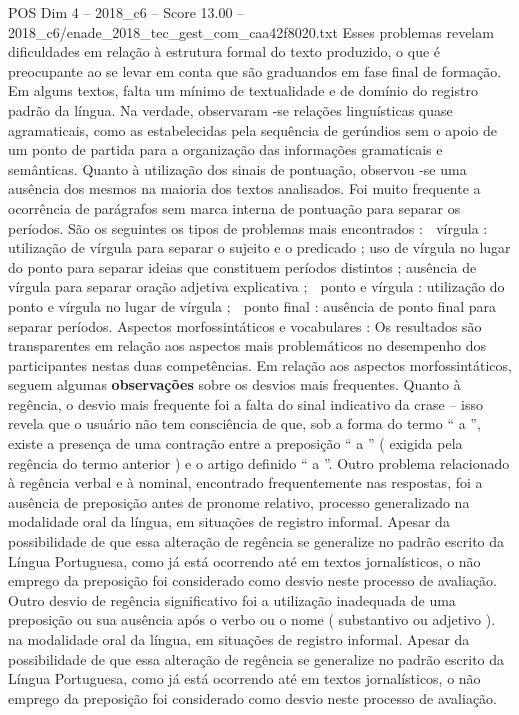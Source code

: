 \begin{textsample}{POS Dim 4 – 2018\_c6 – Score 13.00 – 2018\_c6/enade\_2018\_tec\_gest\_com\_caa42f8020.txt}
Esses problemas revelam dificuldades em relação à estrutura formal do texto produzido, o que é preocupante ao se levar em conta que são graduandos em fase final de formação.
Em alguns textos, falta um mínimo de textualidade e de domínio do registro padrão da língua.
Na verdade, observaram -se relações linguísticas quase agramaticais, como as estabelecidas pela sequência de gerúndios sem o apoio de um ponto de partida para a organização das informações gramaticais e semânticas.
Quanto à utilização dos sinais de pontuação, observou -se uma ausência dos mesmos na maioria dos textos analisados.
Foi muito frequente a ocorrência de parágrafos sem marca interna de pontuação para separar os períodos.
São os seguintes os tipos de problemas mais encontrados :  vírgula : utilização de vírgula para separar o sujeito e o predicado ; uso de vírgula no lugar do ponto para separar ideias que constituem períodos distintos ; ausência de vírgula para separar oração adjetiva explicativa ;  ponto e vírgula : utilização do ponto e vírgula no lugar de vírgula ;  ponto final : ausência de ponto final para separar períodos.
Aspectos morfossintáticos e vocabulares : Os resultados são transparentes em relação aos aspectos mais problemáticos no desempenho dos participantes nestas duas competências.
Em relação aos aspectos morfossintáticos, seguem algumas \textbf{observações} sobre os desvios mais frequentes.
Quanto à regência, o desvio mais frequente foi a falta do sinal indicativo da crase – isso revela que o usuário não tem consciência de que, sob a forma do termo “ a ”, existe a presença de uma contração entre a preposição “ a ” ( exigida pela regência do termo anterior ) e o artigo definido “ a ”.
Outro problema relacionado à regência verbal e à nominal, encontrado frequentemente nas respostas, foi a ausência de preposição antes de pronome relativo, processo generalizado na modalidade oral da língua, em situações de registro informal.
Apesar da possibilidade de que essa alteração de regência se generalize no padrão escrito da Língua Portuguesa, como já está ocorrendo até em textos jornalísticos, o não emprego da preposição foi considerado como desvio neste processo de avaliação.
Outro desvio de regência significativo foi a utilização inadequada de uma preposição ou sua ausência após o verbo ou o nome ( substantivo ou adjetivo ). na modalidade oral da língua, em situações de registro informal.
Apesar da possibilidade de que essa alteração de regência se generalize no padrão escrito da Língua Portuguesa, como já está ocorrendo até em textos jornalísticos, o não emprego da preposição foi considerado como desvio neste processo de avaliação.

\end{textsample}
